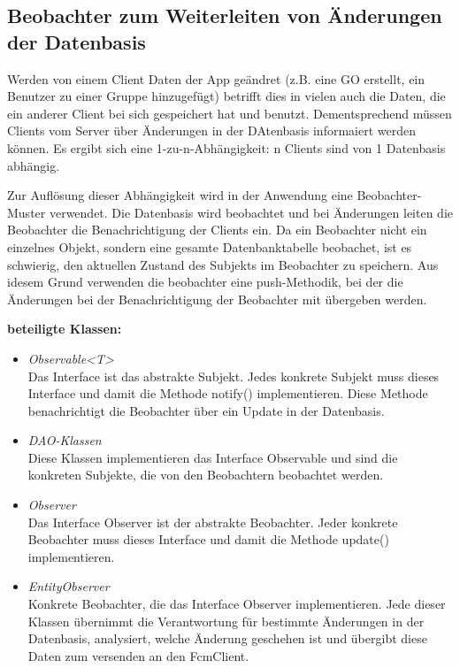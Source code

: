 \documentclass[parskip=full]{scrartcl}
\begin{document}
\subsection{Beobachter zum Weiterleiten von Änderungen der Datenbasis}
Werden von einem Client Daten der App geändret (z.B. eine GO erstellt, ein Benutzer zu einer Gruppe hinzugefügt) betrifft dies in vielen auch die Daten, die ein anderer Client bei sich gespeichert hat und benutzt. Dementsprechend müssen Clients vom Server über Änderungen in der DAtenbasis informaiert werden können. Es ergibt sich eine 1-zu-n-Abhängigkeit: n Clients sind von 1 Datenbasis abhängig.

Zur Auflösung dieser Abhängigkeit wird in der Anwendung eine Beobachter-Muster verwendet. Die Datenbasis wird beobachtet und bei Änderungen leiten die Beobachter die Benachrichtigung der Clients
ein. Da ein Beobachter nicht ein einzelnes Objekt, sondern eine gesamte Datenbanktabelle beobachet, ist es schwierig, den aktuellen Zustand des Subjekts im Beobachter zu speichern. Aus idesem Grund verwenden die beobachter eine push-Methodik, bei der die Änderungen bei der Benachrichtigung der Beobachter mit übergeben werden.

\textbf{beteiligte Klassen:}
\begin{itemize}
	\item \textit{Observable<T>}\\ Das Interface ist das abstrakte Subjekt. Jedes konkrete Subjekt muss dieses Interface und damit die Methode notify() implementieren. Diese Methode benachrichtigt die Beobachter über ein Update in der Datenbasis.
	\item \textit{DAO-Klassen}\\ Diese Klassen implementieren das Interface Observable und sind die konkreten Subjekte, die von den Beobachtern beobachtet werden.
	\item \textit{Observer}\\ Das Interface Observer ist der abstrakte Beobachter. Jeder konkrete Beobachter muss dieses Interface und damit die Methode update() implementieren.
	\item \textit{EntityObserver}\\Konkrete Beobachter, die das Interface Observer implementieren. Jede dieser Klassen übernimmt die Verantwortung für bestimmte Änderungen in der Datenbasis, analysiert, welche Änderung geschehen ist und übergibt diese Daten zum versenden an den FcmClient.
\end{itemize}
\end{document}
